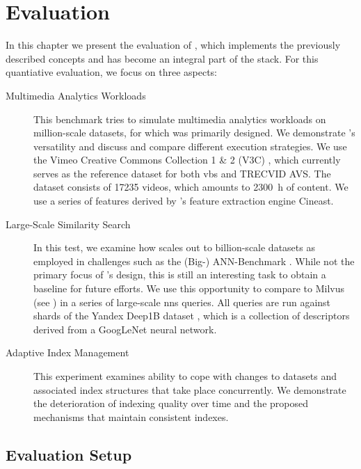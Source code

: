 \chapter{Evaluation}
\label{chapter:evaluation}

In this chapter we present the evaluation of \cottontail{} \cite{Gasser:2020Cottontail}, which implements the previously described concepts and has become an integral part of the \vitrivr{} \cite{Rossetto:2016Vitrivr,Gasser:2019Towards,Gasser:2019Multimodal} stack. For this quantiative evaluation, we focus on three aspects:

\begin{description}
    \item[Multimedia Analytics Workloads] This benchmark tries to simulate multimedia analytics workloads on million-scale datasets, for which \cottontail{} was primarily designed. We demonstrate \cottontail{}'s versatility and discuss and compare different execution strategies. We use the Vimeo Creative Commons Collection 1 \& 2 (V3C) \cite{Berns:2019V3C1,Rossetto:2021Insights}, which currently serves as the reference dataset for both \acrshort{vbs} and TRECVID AVS. The dataset consists of 17235 videos, which amounts to \SI{2300}{\hour} of content. We use a series of features derived by \vitrivr{}'s feature extraction engine Cineast.
    \item[Large-Scale Similarity Search] In this test, we examine how \cottontail{} scales out to billion-scale datasets as employed in challenges such as the (Big-) ANN-Benchmark \cite{Aumueller:2017ANN,Simhadri:2022Results}. While not the primary focus of \cottontail{}'s design, this is still an interesting task to obtain a baseline for future efforts. We use this opportunity to compare \cottontail{} to Milvus (see ) in a series of large-scale \acrshort{nns} queries. All queries are run against shards of the Yandex Deep1B dataset \cite{Babenko:2016Efficient}, which is a collection of descriptors derived from a GoogLeNet \cite{Szegedy:2015Going} neural network.
    \item[Adaptive Index Management] This experiment examines \cottontail{} ability to cope with changes to datasets and associated index structures that take place concurrently. We demonstrate the deterioration of indexing quality over time and the proposed mechanisms that maintain consistent indexes.
\end{description}

\section{Evaluation Setup}

